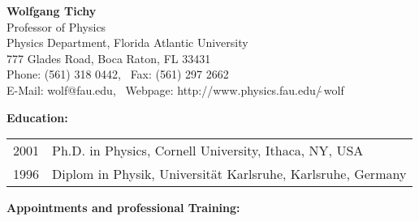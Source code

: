\documentclass[11pt]{article}
\begin{document}
\begin{center}

{\large \bf Wolfgang Tichy}\\
Professor of Physics\\
Physics Department, Florida Atlantic University\\
777 Glades Road, Boca Raton, FL 33431\\
Phone: (561) 318 0442, \ Fax: (561) 297 2662\\
E-Mail: wolf@fau.edu, \ 
Webpage: http://www.physics.fau.edu/$\tilde{\ }$wolf

\end{center}


\smallskip
{\bf Education:}

\medskip
\begin{tabular}{ll}
{2001}&  Ph.D. in Physics, Cornell University,
	  Ithaca, NY, USA \\
{1996}&  Diplom in Physik, Universit\"at Karlsruhe,
	   Karlsruhe, Germany\\ 
\end{tabular}

\bigskip

{\bf Appointments and professional Training:}
\end{document}
